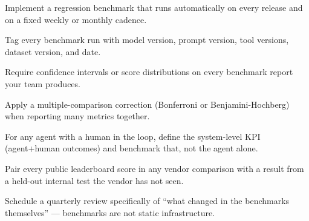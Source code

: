 \begin{TNchecklist}
\item Implement a regression benchmark that runs automatically on every release and on a fixed weekly or monthly cadence.
\item Tag every benchmark run with model version, prompt version, tool versions, dataset version, and date.
\item Require confidence intervals or score distributions on every benchmark report your team produces.
\item Apply a multiple-comparison correction (Bonferroni or Benjamini-Hochberg) when reporting many metrics together.
\item For any agent with a human in the loop, define the system-level KPI (agent+human outcomes) and benchmark that, not the agent alone.
\item Pair every public leaderboard score in any vendor comparison with a result from a held-out internal test the vendor has not seen.
\item Schedule a quarterly review specifically of ``what changed in the benchmarks themselves'' --- benchmarks are not static infrastructure.
\end{TNchecklist}



